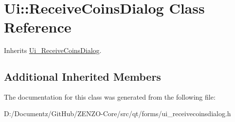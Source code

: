 \hypertarget{class_ui_1_1_receive_coins_dialog}{}\section{Ui\+::Receive\+Coins\+Dialog Class Reference}
\label{class_ui_1_1_receive_coins_dialog}


Inherits \mbox{\hyperlink{class_ui___receive_coins_dialog}{Ui\+\_\+\+Receive\+Coins\+Dialog}}.

\subsection*{Additional Inherited Members}


The documentation for this class was generated from the following file\+:\begin{DoxyCompactItemize}
\item 
D\+:/\+Documentz/\+Git\+Hub/\+Z\+E\+N\+Z\+O-\/\+Core/src/qt/forms/ui\+\_\+receivecoinsdialog.\+h\end{DoxyCompactItemize}
